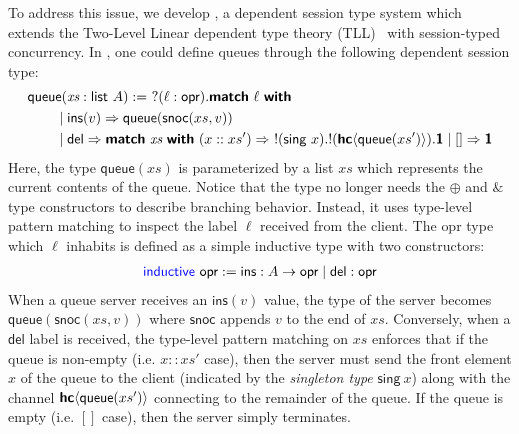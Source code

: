 To address this issue, we develop \TLLC{}, a dependent session type system which
extends the Two-Level Linear dependent type theory (TLL)~\cite{fu25} with
session-typed concurrency. In \TLLC{}, one could define queues through the following
dependent session type:
\begin{alignat*}{2}
  &\textsf{queue} (\textit{xs} : \textsf{list}\ A) :=\ ?(\ell : \textsf{opr}). \textbf{\textsf{match}}\ \ell\ \textbf{\textsf{with}} \\
  &\qquad\mid \textsf{ins}(v) \Rightarrow \textsf{queue}(\textsf{snoc}(xs, v)) \\
  &\qquad\mid \textsf{del} \Rightarrow
    \textbf{\textsf{match}}\ \textit{xs}\ \textbf{\textsf{with}}
    \ (x :: xs') \Rightarrow\ !(\textsf{sing}\ x). !({\textbf{\textsf{hc}}\langle{\textsf{queue}(xs')}\rangle}). \textbf{\textsf{1}}
    \mid [] \Rightarrow \textbf{\textsf{1}}
\end{alignat*}
Here, the type $\textsf{queue}(\textit{xs})$ is parameterized by a list $\textit{xs}$
which represents the current contents of the queue. Notice that the type no longer needs
the $\oplus$ and $\&$ type constructors to describe branching behavior. Instead, it uses
type-level pattern matching to inspect the label $\ell$ received from the client.
The \textsf{opr} type which $\ell$ inhabits is defined as a simple inductive type with
two constructors:
\begin{align*}
  \textsf{\color{blue}inductive}\ \textsf{opr} := \textsf{ins}: A \rightarrow \textsf{opr} \mid \textsf{del}: \textsf{opr}
\end{align*}
When a queue server receives an $\textsf{ins}(v)$ value, the type of the server becomes
$\textsf{queue}(\textsf{snoc}(xs, v))$ where $\textsf{snoc}$ appends $v$ to the end of $xs$.
Conversely, when a $\textsf{del}$ label is received, the type-level pattern matching on $xs$
enforces that if the queue is non-empty (i.e. $x :: xs'$ case), then the server must send
the front element $x$ of the queue to the client (indicated by the \emph{singleton type}
$\textsf{sing}\ x$) along with the channel ${\textbf{\textsf{hc}}\langle{\textsf{queue}(xs')}\rangle}$ connecting to the remainder
of the queue. If the queue is empty (i.e. $[]$ case), then the server simply terminates.

